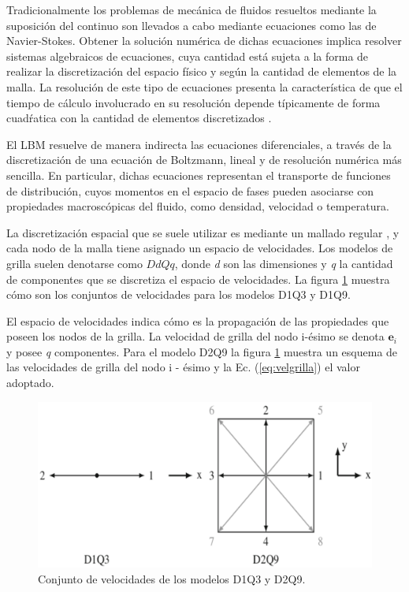 Tradicionalmente los problemas de mecánica de fluidos resueltos mediante la suposición del continuo son llevados a cabo mediante  ecuaciones como las de Navier-Stokes. Obtener la solución numérica de dichas ecuaciones implica resolver sistemas  algebraicos de ecuaciones, cuya cantidad está sujeta a la forma de realizar la discretización del espacio físico y según la cantidad de elementos de la malla. La resolución de este tipo de ecuaciones presenta la característica de que el tiempo de cálculo involucrado en su resolución depende típicamente de forma cuadŕatica con la cantidad de elementos discretizados \cite{kelley1995iterative}.

El LBM resuelve de manera indirecta las ecuaciones diferenciales, a través de la discretización de una ecuación de Boltzmann, lineal y de resolución numérica más sencilla. En particular, dichas ecuaciones representan el transporte de funciones de distribución, cuyos momentos en el espacio de fases pueden asociarse con propiedades macroscópicas del fluido, como densidad, velocidad o temperatura.

La discretización espacial que se suele utilizar es mediante un mallado regular \cite{guo2013lattice}, y  cada nodo de la malla tiene asignado un espacio de velocidades. Los modelos de grilla suelen denotarse como $DdQq$, donde \textit{d} son las dimensiones y \textit{q} la cantidad de componentes que se discretiza el espacio de velocidades. La figura \ref{fig:D1Q3_D2Q9} muestra cómo son los conjuntos de velocidades para los modelos D1Q3 y D1Q9.

El espacio de velocidades indica cómo es la propagación de las propiedades que poseen los nodos de la grilla. La velocidad de grilla del nodo i-ésimo se denota $\mathbf{e}_{i}$ y posee \textit{q} componentes. Para el modelo D2Q9 la figura \ref{fig:D1Q3_D2Q9} muestra un esquema de las velocidades de grilla del nodo i - ésimo y la Ec. (\ref{eq:velgrilla}) el valor adoptado. 

\begin{figure}[h!]
	\centering
	\includegraphics[width=.8\textwidth]{figs/cap1/D1Q3_D2Q9}
	\caption{Conjunto de velocidades de los modelos D1Q3 y D2Q9. \cite{kruger2017lattice}}
	\label{fig:D1Q3_D2Q9}	
\end{figure}


